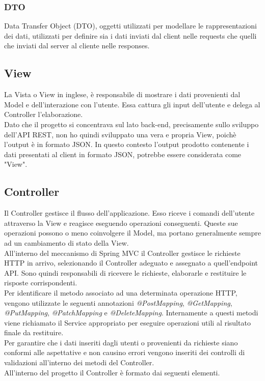 \subsubsection{DTO}
Data Transfer Object (DTO), oggetti utilizzati per modellare le rappresentazioni dei dati, utilizzati per definire sia i dati inviati dal client nelle requests che quelli che inviati dal server al cliente nelle responses.

\subsection{View}
La Vista o View in inglese, è responsabile di mostrare i dati provenienti dal Model e dell'interazione con l'utente. Essa cattura gli input dell'utente e delega al Controller l'elaborazione.\\
Dato che il progetto si concentrava sul lato back-end, precisamente sullo sviluppo dell'API REST, non ho quindi sviluppato una vera e propria View, poichè l'output è in formato JSON. In questo contesto l'output prodotto contenente i dati presentati al client in formato JSON, potrebbe essere considerata come "View".

\subsection{Controller}
Il Controller gestisce il flusso dell'applicazione. Esso riceve i comandi dell'utente attraverso la View e reagisce eseguendo operazioni conseguenti. Queste sue operazioni possono o meno coinvolgere il Model, ma portano generalmente sempre ad un cambiamento di stato della View.\\
All'interno del meccanismo di Spring MVC il Controller gestisce le richieste HTTP in arrivo, selezionando il Controller adeguato e assegnato a quell'endpoint API. Sono quindi responsabili di ricevere le richieste, elaborarle e restituire le risposte corrispondenti.\\
Per identificare il metodo associato ad una determinata operazione HTTP, vengono utilizzate le seguenti annotazioni \textit{@PostMapping}, \textit{@GetMapping}, \textit{@PutMapping}, \textit{@PatchMapping} e \textit{@DeleteMapping}. Internamente a questi metodi viene richiamato il Service appropriato per eseguire operazioni utili al risultato finale da restituire.\\
Per garantire che i dati inseriti dagli utenti o provenienti da richieste siano conformi alle aspettative e non causino errori vengono inseriti dei controlli di validazioni all'interno dei metodi del Controller.\\
All'interno del progetto il Controller è formato dai seguenti elementi.
